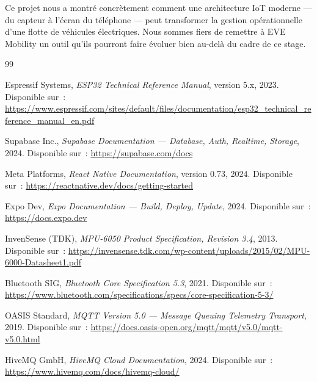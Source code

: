 \documentclass[12pt, a4paper]{report}
\begin{document}
Ce projet nous a montré concrètement comment une architecture IoT moderne --- du capteur
à l'écran du téléphone --- peut transformer la gestion opérationnelle d'une flotte de
véhicules électriques. Nous sommes fiers de remettre à EVE Mobility un outil qu'ils
pourront faire évoluer bien au-delà du cadre de ce stage.

\clearpage
\begin{thebibliography}{99}

  Espressif Systems,
  \textit{ESP32 Technical Reference Manual},
  version 5.x, 2023.
  Disponible sur~: \url{https://www.espressif.com/sites/default/files/documentation/esp32_technical_reference_manual_en.pdf}

  Supabase Inc.,
  \textit{Supabase Documentation --- Database, Auth, Realtime, Storage},
  2024.
  Disponible sur~: \url{https://supabase.com/docs}

  Meta Platforms,
  \textit{React Native Documentation},
  version 0.73, 2024.
  Disponible sur~: \url{https://reactnative.dev/docs/getting-started}

  Expo Dev,
  \textit{Expo Documentation --- Build, Deploy, Update},
  2024.
  Disponible sur~: \url{https://docs.expo.dev}

  InvenSense (TDK),
  \textit{MPU-6050 Product Specification, Revision 3.4},
  2013.
  Disponible sur~: \url{https://invensense.tdk.com/wp-content/uploads/2015/02/MPU-6000-Datasheet1.pdf}

  Bluetooth SIG,
  \textit{Bluetooth Core Specification 5.3},
  2021.
  Disponible sur~: \url{https://www.bluetooth.com/specifications/specs/core-specification-5-3/}

  OASIS Standard,
  \textit{MQTT Version 5.0 --- Message Queuing Telemetry Transport},
  2019.
  Disponible sur~: \url{https://docs.oasis-open.org/mqtt/mqtt/v5.0/mqtt-v5.0.html}

  HiveMQ GmbH,
  \textit{HiveMQ Cloud Documentation},
  2024.
  Disponible sur~: \url{https://www.hivemq.com/docs/hivemq-cloud/}

\end{thebibliography}
\end{document}
